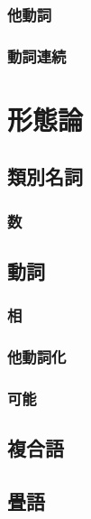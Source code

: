 \subsubsection{他動詞}
\subsubsection{動詞連続}
\newpage

\section{形態論}
\subsection{類別名詞}
\subsubsection{数}
\subsection{動詞}
\subsubsection{相}
\subsubsection{他動詞化}
\subsubsection{可能}
\subsection{複合語}
\subsection{畳語}